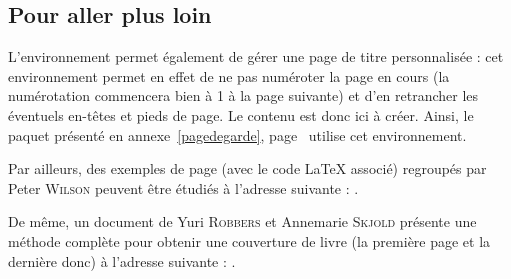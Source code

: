 \subsection{Pour aller plus loin}

L'environnement  permet également de gérer une page de titre personnalisée : cet environnement permet en effet de ne pas numéroter la page en cours (la numérotation commencera bien à 1 à la page suivante) et d'en retrancher les éventuels en-têtes et pieds de page. Le contenu est donc ici à créer. Ainsi, le paquet  présenté en annexe~\ref{pagedegarde}, page~\pageref{pagedegarde} utilise cet environnement.

Par ailleurs, des exemples de page (avec le code \LaTeX{} associé) regroupés par Peter \textsc{Wilson} peuvent être étudiés à l'adresse suivante : .

De même, un document de Yuri \textsc{Robbers} et Annemarie \textsc{Skjold} présente une méthode complète pour obtenir une couverture de livre (la première page et la dernière donc) à l'adresse suivante : .